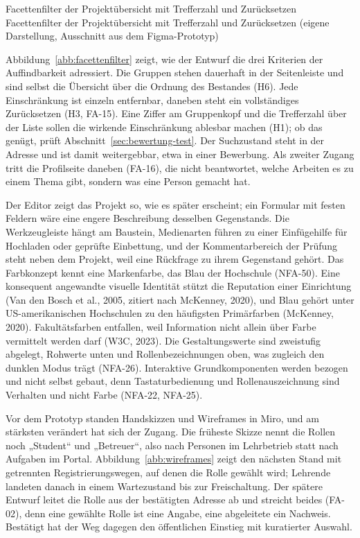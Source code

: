 %
{Facettenfilter der Projektübersicht mit Trefferzahl und Zurücksetzen}%
{Facettenfilter der Projektübersicht mit Trefferzahl und Zurücksetzen (eigene Darstellung, Ausschnitt aus dem Figma-Prototyp)}

Abbildung~\ref{abb:facettenfilter} zeigt, wie der Entwurf die drei Kriterien der Auffindbarkeit adressiert. Die Gruppen stehen dauerhaft in der Seitenleiste und sind selbst die Übersicht über die Ordnung des Bestandes (H6). Jede Einschränkung ist einzeln entfernbar, daneben steht ein vollständiges Zurücksetzen (H3, FA-15). Eine Ziffer am Gruppenkopf und die Trefferzahl über der Liste sollen die wirkende Einschränkung ablesbar machen (H1); ob das genügt, prüft Abschnitt~\ref{sec:bewertung-test}. Der Suchzustand steht in der Adresse und ist damit weitergebbar, etwa in einer Bewerbung. Als zweiter Zugang tritt die Profilseite daneben (FA-16), die nicht beantwortet, welche Arbeiten es zu einem Thema gibt, sondern was eine Person gemacht hat.

Der Editor zeigt das Projekt so, wie es später erscheint; ein Formular mit festen Feldern wäre eine engere Beschreibung desselben Gegenstands. Die Werkzeugleiste hängt am Baustein, Medienarten führen zu einer Einfügehilfe für Hochladen oder geprüfte Einbettung, und der Kommentarbereich der Prüfung steht neben dem Projekt, weil eine Rückfrage zu ihrem Gegenstand gehört. Das Farbkonzept kennt eine Markenfarbe, das Blau der Hochschule (NFA-50). Eine konsequent angewandte visuelle Identität stützt die Reputation einer Einrichtung (Van den Bosch et al., 2005, zitiert nach McKenney, 2020), und Blau gehört unter US-amerikanischen Hochschulen zu den häufigsten Primärfarben (McKenney, 2020). Fakultätsfarben entfallen, weil Information nicht allein über Farbe vermittelt werden darf (W3C, 2023). Die Gestaltungswerte sind zweistufig abgelegt, Rohwerte unten und Rollenbezeichnungen oben, was zugleich den dunklen Modus trägt (NFA-26). Interaktive Grundkomponenten werden bezogen und nicht selbst gebaut, denn Tastaturbedienung und Rollenauszeichnung sind Verhalten und nicht Farbe (NFA-22, NFA-25).

Vor dem Prototyp standen Handskizzen und Wireframes in Miro, und am stärksten verändert hat sich der Zugang. Die früheste Skizze nennt die Rollen noch „Student“ und „Betreuer“, also nach Personen im Lehrbetrieb statt nach Aufgaben im Portal. Abbildung~\ref{abb:wireframes} zeigt den nächsten Stand mit getrennten Registrierungswegen, auf denen die Rolle gewählt wird; Lehrende landeten danach in einem Wartezustand bis zur Freischaltung. Der spätere Entwurf leitet die Rolle aus der bestätigten Adresse ab und streicht beides (FA-02), denn eine gewählte Rolle ist eine Angabe, eine abgeleitete ein Nachweis. Bestätigt hat der Weg dagegen den öffentlichen Einstieg mit kuratierter Auswahl.

